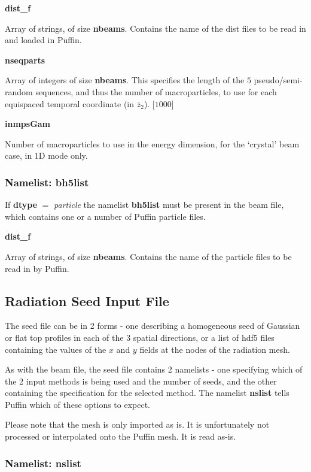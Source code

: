 \documentclass[12pt]{article}%
\begin{document}
{\bf dist\_f}

Array of strings, of size {\bf nbeams}. Contains the name of the dist files to be read in and loaded in Puffin.

{\bf nseqparts}

Array of integers of size {\bf nbeams}. This specifies the length of the $5$ pseudo/semi-random sequences, and thus the number of macroparticles, to use for each equispaced temporal coordinate (in $\bar{z}_2$). [$1000$]

{\bf inmpsGam}

Number of macroparticles to use in the energy dimension, for the `crystal' beam case, in $1$D mode only.


\subsubsection{Namelist: bh5list}

If {\bf dtype} $=$ {\it particle} the namelist {\bf bh5list} must be present in the beam file, which contains one or a number of Puffin particle files.

{\bf dist\_f}

Array of strings, of size {\bf nbeams}. Contains the name of the particle files to be read in by Puffin.



\newpage

\subsection{Radiation Seed Input File}

The seed file can be in 2 forms - one describing a homogeneous seed of Gaussian or flat top profiles in each of the 3 spatial directions, or a list of hdf5 files containing the values of the $x$ and $y$ fields at the nodes of the radiation mesh.

As with the beam file, the seed file contains 2 namelists - one specifying which of the 2 input methods is being used and the number of seeds, and the other containing the specification for the selected method. The namelist {\bf nslist} tells Puffin which of these options to expect.

Please note that the mesh is only imported as is. It is unfortunately not processed or interpolated onto the Puffin mesh. It is read as-is.


\subsubsection{Namelist: nslist}
\end{document}
